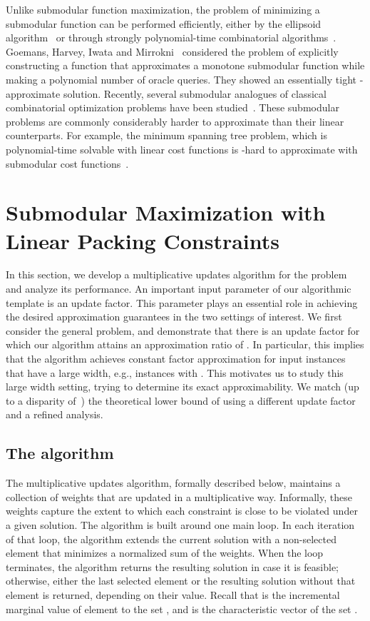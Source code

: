 \documentclass[11pt]{article}
\theoremstyle{plain}
\theoremstyle{definition}
\begin{document}
Unlike submodular function maximization, the problem of minimizing
a submodular function can be performed efficiently, either by the
ellipsoid algorithm~\cite{GrotschelLS81} or through strongly
polynomial-time combinatorial
algorithms~\cite{Schrijver00,IwataFF01,Iwata03,Orlin07,Iwata08,IwataO09}.
Goemans, Harvey, Iwata and Mirrokni~\cite{GoemansHIM09} considered
the problem of explicitly constructing a function that
approximates a monotone submodular function while making a
polynomial number of oracle queries. They showed an essentially
tight -approximate solution. Recently, several
submodular analogues of classical combinatorial optimization
problems have been studied~\cite{SvitkinaF08,GoelKTW09,IwataN09}.
These submodular problems are commonly considerably harder to
approximate than their linear counterparts. For example, the
minimum spanning tree problem, which is polynomial-time solvable
with linear cost functions is -hard to approximate with
submodular cost functions~\cite{GoelKTW09}.


\section{Submodular Maximization with Linear Packing Constraints} \label{sec:GeneralPacking}
In this section, we develop a multiplicative updates algorithm for
the problem and analyze its performance. An important input
parameter of our algorithmic template is an update factor. This
parameter plays an essential role in achieving the desired
approximation guarantees in the two settings of interest. We first
consider the general problem, and demonstrate that there is an
update factor for which our algorithm attains an approximation
ratio of . In particular, this implies that
the algorithm achieves constant factor approximation for input
instances that have a large width, e.g., instances with . This motivates us to study this large width
setting, trying to determine its exact approximability. We match
(up to a disparity of~) the theoretical lower bound of
 using a different update factor and a refined analysis.


\subsection{The algorithm} \label{subsec:Algorithm}
The multiplicative updates algorithm, formally described below,
maintains a collection of weights that are updated in a
multiplicative way. Informally, these weights capture the extent
to which each constraint is close to be violated under a given
solution. The algorithm is built around one main loop. In each
iteration of that loop, the algorithm extends the current solution
with a non-selected element that minimizes a normalized sum of the
weights. When the loop terminates, the algorithm returns the
resulting solution in case it is feasible; otherwise, either the
last selected element or the resulting solution without that
element is returned, depending on their value. Recall that  is the incremental marginal value of
element  to the set , and  is the characteristic vector
of the set .
\end{document}
